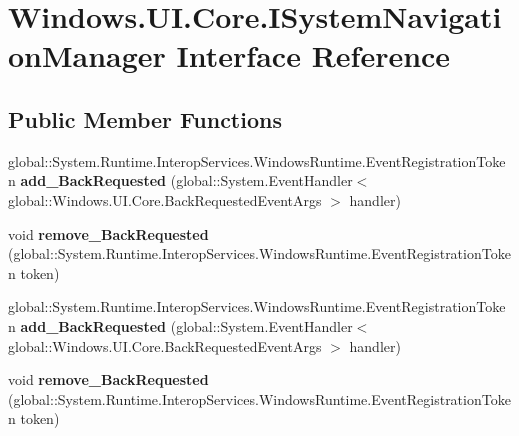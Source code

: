 \hypertarget{interface_windows_1_1_u_i_1_1_core_1_1_i_system_navigation_manager}{}\section{Windows.\+U\+I.\+Core.\+I\+System\+Navigation\+Manager Interface Reference}
\label{interface_windows_1_1_u_i_1_1_core_1_1_i_system_navigation_manager}
\subsection*{Public Member Functions}
\begin{DoxyCompactItemize}
\item 
\mbox{\label{interface_windows_1_1_u_i_1_1_core_1_1_i_system_navigation_manager_a346f0983caf11773a17b0f1d18a0cc58}} 
global\+::\+System.\+Runtime.\+Interop\+Services.\+Windows\+Runtime.\+Event\+Registration\+Token {\bfseries add\+\_\+\+Back\+Requested} (global\+::\+System.\+Event\+Handler$<$ global\+::\+Windows.\+U\+I.\+Core.\+Back\+Requested\+Event\+Args $>$ handler)
\item 
\mbox{\label{interface_windows_1_1_u_i_1_1_core_1_1_i_system_navigation_manager_a1492875ba0a07be2510a20ee300185f2}} 
void {\bfseries remove\+\_\+\+Back\+Requested} (global\+::\+System.\+Runtime.\+Interop\+Services.\+Windows\+Runtime.\+Event\+Registration\+Token token)
\item 
\mbox{\label{interface_windows_1_1_u_i_1_1_core_1_1_i_system_navigation_manager_a346f0983caf11773a17b0f1d18a0cc58}} 
global\+::\+System.\+Runtime.\+Interop\+Services.\+Windows\+Runtime.\+Event\+Registration\+Token {\bfseries add\+\_\+\+Back\+Requested} (global\+::\+System.\+Event\+Handler$<$ global\+::\+Windows.\+U\+I.\+Core.\+Back\+Requested\+Event\+Args $>$ handler)
\item 
\mbox{\label{interface_windows_1_1_u_i_1_1_core_1_1_i_system_navigation_manager_a1492875ba0a07be2510a20ee300185f2}} 
void {\bfseries remove\+\_\+\+Back\+Requested} (global\+::\+System.\+Runtime.\+Interop\+Services.\+Windows\+Runtime.\+Event\+Registration\+Token token)

\end{DoxyCompactItemize}
